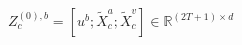 \begin{equation}
\label{eq:branch-input}
{Z}_{c}^{(0),b}=\left[ {u}^{b};{\widetilde{X}}_{c}^{a};{\widetilde{X}}_{c}^{v}\right] \in {\mathbb{R}}^{(2T+1)\times d}
\end{equation}
